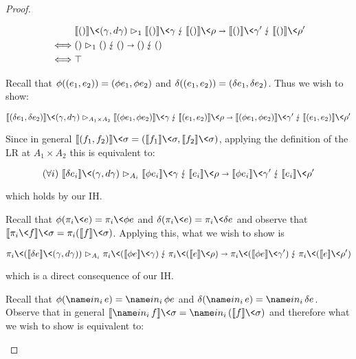 \begin{proof}
\begin{description}[topsep=\baselineskip,itemsep=\baselineskip]
    \begin{align*}
    &\weirdat \tunit
             {\den{\etuple{}}\<(\gamma,\dgamma)}
             {\den{\etuple{}}\<\gamma}
             {\den{\etuple{}}\<\rho}
             {\den{\etuple{}}\<\gamma'}
             {\den{\etuple{}}\<\rho'}
    \\
    \iff
    &\weirdat \tunit {\tuple{}}{\tuple{}}{\tuple{}}{\tuple{}}{\tuple{}}
    \\
    \iff& \top
    \end{align*}

  \item[Case $\infer{(\J{e_i}\G{A_i})_i}{\J{\etuple{e_1,e_2}}\G{A_1 \times A_2}}$:]
    Recall that $\phi(({e_1,e_2})) = ({\phi e_1, \phi e_2})$ and $\delta(({e_1, e_2})) = ({\delta e_1, \delta e_2})$. Thus we wish to show:

    \[
    \weirdat {A_1 \times A_2}
             {\den{\etuple{\delta e_1, \delta e_2}}\<(\gamma,\dgamma)}
             {\den{\etuple{\phi e_1, \phi e_2}}\<\gamma}
             {\den{\etuple{e_1, e_2}}\<\rho}
             {\den{\etuple{\phi e_1, \phi e_2}}\<\gamma'}
             {\den{\etuple{e_1, e_2}}\<\rho'}
    \]

    \noindent
    Since in general $\den{(f_1, f_2)} \<\sigma = \tuple{\den{f_1}\<\sigma, \den{f_2}\<\sigma}$, applying the definition of the LR at $A_1 \times A_2$ this is equivalent to:

    \[
    \fa i
    \weirdat{A_i}
    {\den{\delta e_i} \<(\gamma,\dgamma)}
    {\den{\phi e_i}\<\gamma}
    {\den{e_i}\<\rho}
    {\den{\phi e_i}\<\gamma'}
    {\den{e_i}\<\rho'}
    \]

    \noindent
    which holds by our IH.

  \item[Case $\infer{\J e \G {A_1 \times A_2}}{\J{\pi_i\<e}\G{A_i}}$.]
    Recall that $\phi(\pi_i\<e) = \pi_i\<\phi e$ and $\delta(\pi_i\<e) = \pi_i\<\delta e$ and observe that $\den{\pi_i\<f}\<\sigma = \pi_i(\den{f}\<\sigma)$. Applying this, what we wish to show is

    \[
    \weirdat {A_i}
    {\pi_i\<(\den{\delta e}\<(\gamma,\dgamma))}
    {\pi_i \<(\den{\phi e}\<\gamma)}
    {\pi_i \<(\den{e}\<\rho)}
    {\pi_i \<(\den{\phi e}\<\gamma')}
    {\pi_i \<(\den{e}\<\rho')}
    \]

    \noindent
    which is a direct consequence of our IH.

  \item[Case $\infer{\J e \G {A_i}}{\J {\inj i e} \G {A_1 + A_2}}$.]
    Recall that $\phi(\inj i e) = \inj i \phi e$ and $\delta(\inj i e) = \inj i \delta e$. Observe that in general $\den{\inj i f}\<\sigma = \inj i (\den{f}\<\sigma)$ and therefore what we wish to show is equivalent to:


\end{description}
\end{proof}
